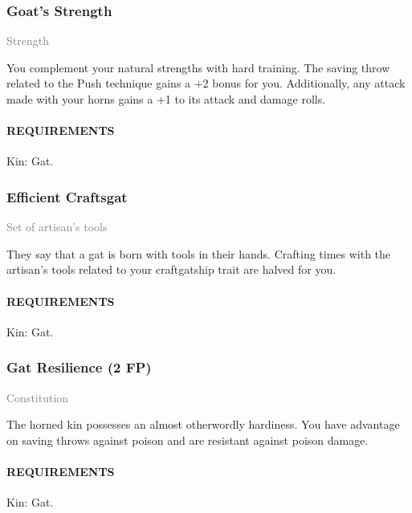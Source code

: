         \subsubsection{Goat's Strength} \label{feat::goatsstrength}
        \small{\textcolor{gray}{Strength}}

        \normalsize
        You complement your natural strengths with hard training.
        The saving throw related to the Push technique gains a +2 bonus for you.
        Additionally, any attack made with your horns gains a +1 to its attack and damage rolls.
        \paragraph{REQUIREMENTS} Kin: Gat.

        \subsubsection{Efficient Craftsgat} \label{feat::efficientcraftsgat}
        \small{\textcolor{gray}{Set of artisan's tools}}

        \normalsize
        They say that a gat is born with tools in their hands.
        Crafting times with the artisan's tools related to your craftgatship trait are halved for you.
        \paragraph{REQUIREMENTS} Kin: Gat.

        \subsubsection{Gat Resilience (2 FP)} \label{feat::gatresilience}
        \small{\textcolor{gray}{Constitution}}

        \normalsize
        The horned kin possesses an almost otherwordly hardiness.
        You have advantage on saving throws against poison and are resistant against poison damage.
        \paragraph{REQUIREMENTS} Kin: Gat.

